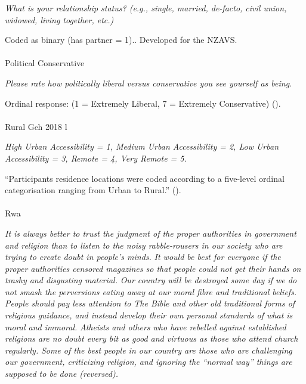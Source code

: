 \documentclass[
  single column]{article}
\makeatletter
\let\oldparagraph\paragraph
\renewcommand{\paragraph}{
    \@ifstar
      \xxxParagraphStar
      \xxxParagraphNoStar
  }
\newcommand{\xxxParagraphStar}[1]{\oldparagraph*{#1}\mbox{}}
\newcommand{\xxxParagraphNoStar}[1]{\oldparagraph{#1}\mbox{}}
\makeatother
\begin{document}
\emph{What is your relationship status? (e.g., single, married,
de-facto, civil union, widowed, living together, etc.)}

Coded as binary (has partner = 1).. Developed for the NZAVS.

\paragraph{Political Conservative}\label{political-conservative}

\emph{Please rate how politically liberal versus conservative you see
yourself as being.}

Ordinal response: (1 = Extremely Liberal, 7 = Extremely Conservative)
().

\paragraph{Rural Gch 2018 l}\label{rural-gch-2018-l}

\emph{High Urban Accessibility = 1, Medium Urban Accessibility = 2, Low
Urban Accessibility = 3, Remote = 4, Very Remote = 5.}

``Participants residence locations were coded according to a five-level
ordinal categorisation ranging from Urban to Rural.''
().

\paragraph{Rwa}\label{rwa}

\emph{It is always better to trust the judgment of the proper
authorities in government and religion than to listen to the noisy
rabble-rousers in our society who are trying to create doubt in people's
minds.} \emph{It would be best for everyone if the proper authorities
censored magazines so that people could not get their hands on trashy
and disgusting material.} \emph{Our country will be destroyed some day
if we do not smash the perversions eating away at our moral fibre and
traditional beliefs.} \emph{People should pay less attention to The
Bible and other old traditional forms of religious guidance, and instead
develop their own personal standards of what is moral and immoral.}
\emph{Atheists and others who have rebelled against established
religions are no doubt every bit as good and virtuous as those who
attend church regularly.} \emph{Some of the best people in our country
are those who are challenging our government, criticizing religion, and
ignoring the ``normal way'' things are supposed to be done (reversed).}
\end{document}
